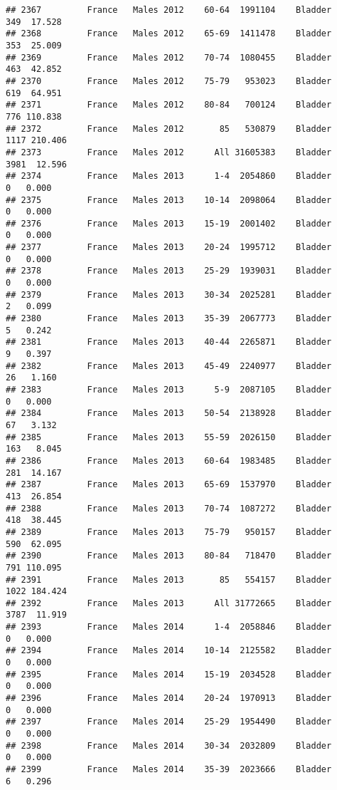 \documentclass[
]{article}
\begin{document}
\begin{verbatim}
## 2367         France   Males 2012    60-64  1991104    Bladder    349  17.528
## 2368         France   Males 2012    65-69  1411478    Bladder    353  25.009
## 2369         France   Males 2012    70-74  1080455    Bladder    463  42.852
## 2370         France   Males 2012    75-79   953023    Bladder    619  64.951
## 2371         France   Males 2012    80-84   700124    Bladder    776 110.838
## 2372         France   Males 2012       85   530879    Bladder   1117 210.406
## 2373         France   Males 2012      All 31605383    Bladder   3981  12.596
## 2374         France   Males 2013      1-4  2054860    Bladder      0   0.000
## 2375         France   Males 2013    10-14  2098064    Bladder      0   0.000
## 2376         France   Males 2013    15-19  2001402    Bladder      0   0.000
## 2377         France   Males 2013    20-24  1995712    Bladder      0   0.000
## 2378         France   Males 2013    25-29  1939031    Bladder      0   0.000
## 2379         France   Males 2013    30-34  2025281    Bladder      2   0.099
## 2380         France   Males 2013    35-39  2067773    Bladder      5   0.242
## 2381         France   Males 2013    40-44  2265871    Bladder      9   0.397
## 2382         France   Males 2013    45-49  2240977    Bladder     26   1.160
## 2383         France   Males 2013      5-9  2087105    Bladder      0   0.000
## 2384         France   Males 2013    50-54  2138928    Bladder     67   3.132
## 2385         France   Males 2013    55-59  2026150    Bladder    163   8.045
## 2386         France   Males 2013    60-64  1983485    Bladder    281  14.167
## 2387         France   Males 2013    65-69  1537970    Bladder    413  26.854
## 2388         France   Males 2013    70-74  1087272    Bladder    418  38.445
## 2389         France   Males 2013    75-79   950157    Bladder    590  62.095
## 2390         France   Males 2013    80-84   718470    Bladder    791 110.095
## 2391         France   Males 2013       85   554157    Bladder   1022 184.424
## 2392         France   Males 2013      All 31772665    Bladder   3787  11.919
## 2393         France   Males 2014      1-4  2058846    Bladder      0   0.000
## 2394         France   Males 2014    10-14  2125582    Bladder      0   0.000
## 2395         France   Males 2014    15-19  2034528    Bladder      0   0.000
## 2396         France   Males 2014    20-24  1970913    Bladder      0   0.000
## 2397         France   Males 2014    25-29  1954490    Bladder      0   0.000
## 2398         France   Males 2014    30-34  2032809    Bladder      0   0.000
## 2399         France   Males 2014    35-39  2023666    Bladder      6   0.296

\end{verbatim}
\end{document}
